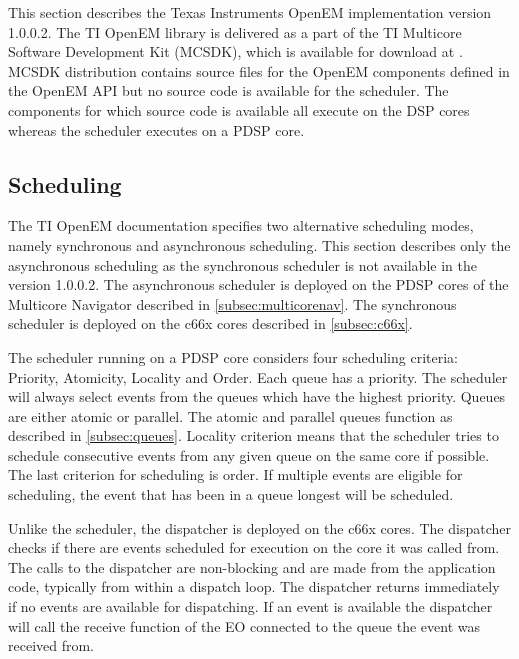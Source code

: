 This section describes the Texas Instruments OpenEM implementation version 1.0.0.2. The TI OpenEM library is delivered as a part of the TI Multicore Software Development Kit (MCSDK), which is available for download at \cite{mcsdkdown}. MCSDK distribution contains source files for the OpenEM components defined in the OpenEM API but no source code is available for the scheduler. The components for which source code is available all execute on the DSP cores whereas the scheduler executes on a PDSP core. 


\subsection{Scheduling}
The TI OpenEM documentation specifies two alternative scheduling modes, namely synchronous and asynchronous scheduling. This section describes only the asynchronous scheduling as the synchronous scheduler is not available in the version 1.0.0.2. The asynchronous scheduler is deployed on the PDSP cores of the Multicore Navigator described in \ref{subsec:multicorenav}. The synchronous scheduler is deployed on the c66x cores described in \ref{subsec:c66x}.  

The scheduler running on a PDSP core considers four scheduling criteria: Priority, Atomicity, Locality and Order. Each queue has a priority. The scheduler will always select events from the queues which have the highest priority. Queues are either atomic or parallel. The atomic and parallel queues function as described in \ref{subsec:queues}. Locality criterion means that the scheduler tries to schedule consecutive events from any given queue on the same core if possible. The last criterion for scheduling is order. If multiple events are eligible for scheduling, the event that has been in a queue longest will be scheduled. \cite{openemwhite}

 Unlike the scheduler, the dispatcher is deployed on the c66x cores. The dispatcher checks if there are events scheduled for execution on the core it was called from. The calls to the dispatcher are non-blocking and are made from the application code, typically from within a dispatch loop. The dispatcher returns immediately if no events are available for dispatching. If an event is available the dispatcher will call the receive function of the EO connected to the queue the event was received from. \cite{openemwhite}

